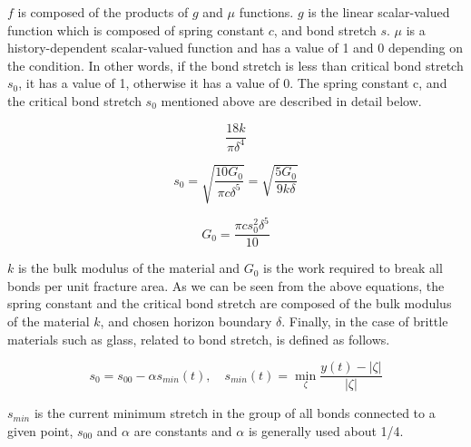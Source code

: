 $f$ is composed of the products of $g$ and $\mu$ functions. $g$ is the linear scalar-valued function which is composed of spring constant $c$, and bond stretch $s$. $\mu$ is a history-dependent scalar-valued function and has a value of 1 and 0 depending on the condition. In other words, if the bond stretch is less than critical bond stretch $s_0$, it has a value of 1, otherwise it has a value of 0. The spring constant c, and the critical bond stretch $s_0$ mentioned above are described in detail below.

 \begin{equation}
\frac{18k}{\pi\delta^4}
\end{equation}

 \begin{equation}
s_0=\sqrt{\frac{10G_0}{\pi c\delta^5}}=\sqrt{\frac{5G_0}{9 k\delta}}
\end{equation}

 \begin{equation}
G_0=\frac{\pi cs_0^2\delta^5}{10} 
\end{equation}

$k$ is the bulk modulus of the material and $G_0$ is the work required to break all bonds per unit fracture area. As we can be seen from the above equations, the spring constant and the critical bond stretch are composed of the bulk modulus of the material $k$, and chosen horizon boundary $\delta$. Finally, in the case of brittle materials such as glass, related to bond stretch, is defined as follows.

 \begin{equation}
s_0=s_{00}-\alpha s_{min}(t), \quad s_{min}(t)=\min_\zeta{\frac{y(t)-|\zeta|}{|\zeta|}}
\end{equation}

$s_{min}$ is the current minimum stretch in the group of all bonds connected to a given point, $s_{00}$ and $\alpha$ are constants and $\alpha$ is generally used about 1/4. 


